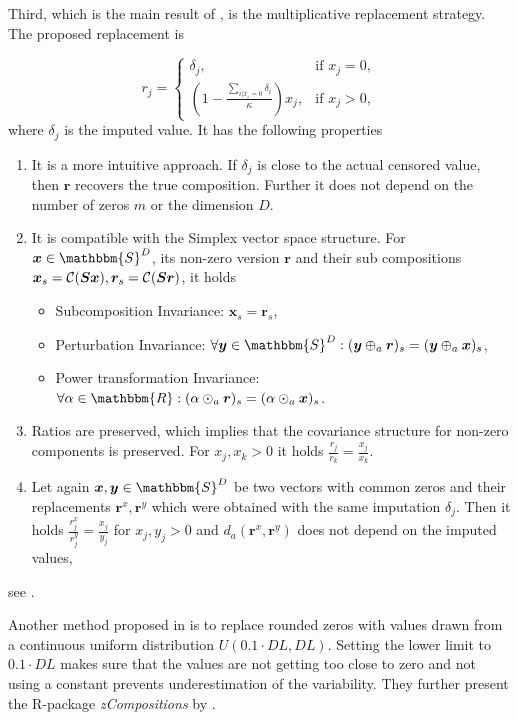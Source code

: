 Third, which is the main result of \textcite{Josep:2003}, is the multiplicative replacement strategy. The proposed replacement is 

\begin{equation}
r_j = 
\begin{cases}
\delta_j, & \text{if } x_j=0, \\
\left( 1- \frac{\sum_{i | x_i=0}\delta_i}{\kappa} \right)x_j, & \text{if } x_j>0, 
\end{cases}
\label{eq:multiplicative replacement strategy}
\end{equation}
%
where $\delta_j$ is the imputed value. It has the following properties 

\begin{enumerate}
	\item It is a more intuitive approach. If $\delta_j$ is close to the actual censored value, then $\bm{r}$ recovers the true composition. Further it does not depend on the number of zeros $m$ or the dimension $D$. 
	\item It is compatible with the Simplex vector space structure. For $\bm{x} \in \mathbbm{S}^D$, its non-zero version $\bm{r}$ and their sub compositions $\bm{x}_s = \mathcal{C}(\bm{Sx}),\bm{r}_s = \mathcal{C}(\bm{Sr})$, it holds 
	\begin{itemize}
		\item Subcomposition Invariance: $\bm{x}_s = \bm{r}_s$,
		\item Perturbation Invariance: $\forall \bm{y} \in \mathbbm{S}^D: (\bm{y} \oplus_a \bm{r})_s = (\bm{y} \oplus_a \bm{x})_s$,
		\item Power transformation Invariance: $\forall \alpha \in \mathbbm{R}: (\alpha \odot_a \bm{r})_s = (\alpha \odot_a \bm{x})_s$. 
	\end{itemize}
	\item Ratios are preserved, which implies that the covariance structure for non-zero components is preserved. For  $x_j,x_k >0$ it holds $\frac{r_j}{r_k} = \frac{x_j}{x_k}$. 
	\item Let again $\bm{x},\bm{y} \in \mathbbm{S}^D$ be two vectors with common zeros and their replacements $\bm{r}^x,\bm{r}^y$ which were obtained with the same imputation $\delta_j$. Then it holds $\frac{r^x_j}{r^y_j}=\frac{x_j}{y_j}$ for $x_j,y_j>0$ and $d_a(\bm{r}^x,\bm{r}^y)$ does not depend on the imputed values,
\end{enumerate}
see \textcite{Josep:2003}.

Another method proposed in \textcite{Lubbe:2021} is to replace rounded zeros with values drawn from a continuous uniform distribution $U(0.1\cdot DL,DL)$. Setting the lower limit to $0.1\cdot DL$ makes sure that the values are not getting too close to zero and not using a constant prevents underestimation of the variability. They further present the R-package \textit{zCompositions} by \textcite{Palarea-Albaladejo:2015}. 

